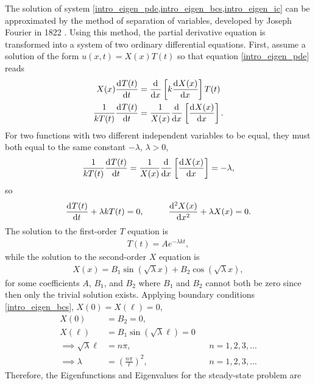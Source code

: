 The solution of system \cref{intro_eigen_pde,intro_eigen_bcs,intro_eigen_ic} can be approximated by the method of separation of variables, developed by Joseph Fourier in 1822 \citep{davis_2013}.  Using this method, the partial derivative equation is transformed into a system of two ordinary differential equations.  First, assume a solution of the form $u(x,t) = X(x)T(t)$ so that equation \cref{intro_eigen_pde} reads
\begin{align*}
  X(x)\frac{\mathrm{d}{^{}} T(t)}{\mathrm{d} t{^{}} }  &= \frac{\mathrm{d}{^{}} }{\mathrm{d} x{^{}} } \left[ k \frac{\mathrm{d}{^{}} X(x)}{\mathrm{d} x{^{}} } \right] T(t) \\ 
  \frac{1}{k T(t)}\frac{\mathrm{d}{^{}} T(t)}{\mathrm{d} t{^{}} }  &= \frac{1}{X(x)} \frac{\mathrm{d}{^{}} }{\mathrm{d} x{^{}} } \left[ \frac{\mathrm{d}{^{}} X(x)}{\mathrm{d} x{^{}} } \right].
\end{align*}
For two functions with two different independent variables to be equal, they must both equal to the same constant $-\lambda$, $\lambda > 0$,
\begin{align*}
  \frac{1}{k T(t)}\frac{\mathrm{d}{^{}} T(t)}{\mathrm{d} t{^{}} } = \frac{1}{X(x)} \frac{\mathrm{d}{^{}} }{\mathrm{d} x{^{}} } \left[ \frac{\mathrm{d}{^{}} X(x)}{\mathrm{d} x{^{}} } \right] = - \lambda, 
\end{align*}
so
\begin{align}
  \label{intro_eigen_separated}
  \totder{T(t)}{t} + \lambda k T(t) = 0, \hspace{10mm} \totder[2]{X(x)}{x} + \lambda X(x) = 0.
\end{align}
The solution to the first-order $T$ equation is 
\begin{align}
  \label{intro_eigen_t}
  T(t) = Ae^{-\lambda k t},
\end{align}
while the solution to the second-order $X$ equation is
\begin{align*}
  X(x) = B_1 \sin\left( \sqrt{\lambda} x \right) + B_2 \cos\left( \sqrt{\lambda} x \right),
\end{align*}
for some coefficients $A$, $B_1$, and $B_2$ where $B_1$ and $B_2$ cannot both be zero since then only the trivial solution exists.  Applying boundary conditions \cref{intro_eigen_bcs}, $X(0) = X(\ell) = 0$,
\begin{align*}
  X(0) &= B_2 = 0, \\
  X(\ell) &= B_1 \sin\left( \sqrt{\lambda} \ell \right) = 0 &&\\
  \implies \sqrt{\lambda} \ell &= n\pi, &&n = 1,2,3,\dots \\
  \implies \lambda &= \left( \frac{n \pi}{\ell} \right)^2, &&n = 1,2,3,\dots
\end{align*}
Therefore, the Eigenfunctions and Eigenvalues for the steady-state problem are
